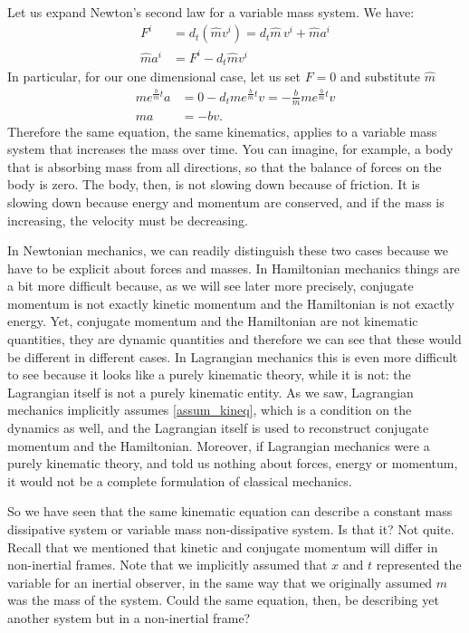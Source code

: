 Let us expand Newton's second law for a variable mass system. We have:
\begin{equation}
	\begin{aligned}
		F^i &= d_t (\hat{m}v^i) = d_t \hat{m} \, v^i + \hat{m} a^i \\
		\hat{m} a^i &= F^i - d_t \hat{m} v^i
	\end{aligned}
\end{equation}
In particular, for our one dimensional case, let us set $F=0$ and substitute $\hat{m}$
\begin{equation}
	\begin{aligned}
		m e^{\frac{b}{m}t} a &= 0 - d_t m e^{\frac{b}{m}t} v = -\frac{b}{m} m e^{\frac{b}{m}t} v \\
		ma &= -bv.
	\end{aligned}
\end{equation}
Therefore the same equation, the same kinematics, applies to a variable mass system that increases the mass over time. You can imagine, for example, a body that is absorbing mass from all directions, so that the balance of forces on the body is zero. The body, then, is not slowing down because of friction. It is slowing down because energy and momentum are conserved, and if the mass is increasing, the velocity must be decreasing.

In Newtonian mechanics, we can readily distinguish these two cases because we have to be explicit about forces and masses. In Hamiltonian mechanics things are a bit more difficult because, as we will see later more precisely, conjugate momentum is not exactly kinetic momentum and the Hamiltonian is not exactly energy. Yet, conjugate momentum and the Hamiltonian are not kinematic quantities, they are dynamic quantities and therefore we can see that these would be different in different cases. In Lagrangian mechanics this is even more difficult to see because it looks like a purely kinematic theory, while it is not: the Lagrangian itself is not a purely kinematic entity. As we saw, Lagrangian mechanics implicitly assumes \ref{assum_kineq}, which is a condition on the dynamics as well, and the Lagrangian itself is used to reconstruct conjugate momentum and the Hamiltonian. Moreover, if Lagrangian mechanics were a purely kinematic theory, and told us nothing about forces, energy or momentum, it would not be a complete formulation of classical mechanics.

So we have seen that the same kinematic equation can describe a constant mass dissipative system or variable mass non-dissipative system. Is that it? Not quite. Recall that we mentioned that kinetic and conjugate momentum will differ in non-inertial frames. Note that we implicitly assumed that $x$ and $t$ represented the variable for an inertial observer, in the same way that we originally assumed $m$ was the mass of the system. Could the same equation, then, be describing yet another system but in a non-inertial frame?

